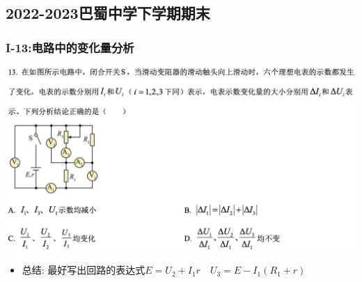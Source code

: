 \documentclass{article}
\begin{document}
\vspace{2em}


\subsection{2022-2023巴蜀中学下学期期末}
\subsubsection{I-13:电路中的变化量分析}
\includegraphics[width=50em,keepaspectratio]{./pictures/1.3-2.png}

\begin{itemize}
    \item 总结: \quad 最好写出回路的表达式$E = U_{2} + I_{1}r  \quad U_{3} = E - I_{1}(R_{1} + r)$
\end{itemize}

\vspace{2em}
\end{document}
